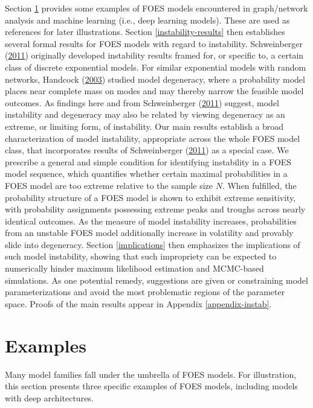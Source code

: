 \documentclass[]{article}
\theoremstyle{definition}
\begin{document}
Section \ref{examples} provides some examples of FOES models encountered
in graph/network analysis and machine learning (i.e., deep learning
models). These are used as references for later illustrations. Section
\ref{instability-results} then establishes several formal results for
FOES models with regard to instability. Schweinberger
(\protect\hyperlink{ref-schweinberger2011instability}{2011}) originally
developed instability results framed for, or specific to, a certain
class of discrete exponential models. For similar exponential models
with random networks, Handcock
(\protect\hyperlink{ref-handcock2003assessing}{2003}) studied model
degeneracy, where a probability model places near complete mass on modes
and may thereby narrow the feasible model outcomes. As findings here and
from Schweinberger
(\protect\hyperlink{ref-schweinberger2011instability}{2011}) suggest,
model instability and degeneracy may also be related by viewing
degeneracy as an extreme, or limiting form, of instability. Our main
results establish a broad characterization of model instability,
appropriate across the whole FOES model class, that incorporates results
of Schweinberger
(\protect\hyperlink{ref-schweinberger2011instability}{2011}) as a
special case. We prescribe a general and simple condition for
identifying instability in a FOES model sequence, which quantifies
whether certain maximal probabilities in a FOES model are too extreme
relative to the sample size \(N\). When fulfilled, the probability
structure of a FOES model is shown to exhibit extreme sensitivity, with
probability assignments possessing extreme peaks and troughs across
nearly identical outcomes. As the measure of model instability
increases, probabilities from an unstable FOES model additionally
increase in volatility and provably slide into degeneracy. Section
\ref{implications} then emphasizes the implications of such model
instability, showing that such impropriety can be expected to
numerically hinder maximum likelihood estimation and MCMC-based
simulations. As one potential remedy, suggestions are given or
constraining model parameterizations and avoid the most problematic
regions of the parameter space. Proofs of the main results appear in
Appendix \ref{appendix-instab}.

\section{Examples}\label{examples}

Many model families fall under the umbrella of FOES models. For
illustration, this section presents three specific examples of FOES
models, including models with deep architectures.
\end{document}
